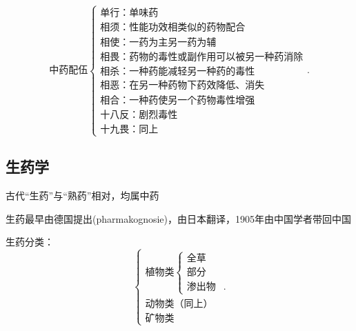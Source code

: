 \[
    \mbox{中药配伍}
    \begin{cases}
        \mbox{单行：单味药}\\ 
        \mbox{相须：性能功效相类似的药物配合}\\ 
        \mbox{相使：一药为主另一药为辅}\\
        \mbox{相畏：药物的毒性或副作用可以被另一种药消除}\\ 
        \mbox{相杀：一种药能减轻另一种药的毒性}\\ 
        \mbox{相恶：在另一种药物下药效降低、消失}\\ 
        \mbox{相合：一种药使另一个药物毒性增强}\\
        \mbox{十八反：剧烈毒性}\\ 
        \mbox{十九畏：同上}
    \end{cases}
.\] 
\subsection{生药学}%
\label{sub:生药学}
\begin{notation}
    古代“生药”与“熟药”相对，均属中药
\end{notation}
生药最早由德国提出(pharmakognosie)，由日本翻译，1905年由中国学者带回中国

生药分类：\[
    \begin{cases}
        \mbox{植物类}\begin{cases}
            \mbox{全草}\\ 
            \mbox{部分}\\ 
            \mbox{渗出物}
        \end{cases}\\ 
        \mbox{动物类（同上）}\\ 
        \mbox{矿物类}
    \end{cases}
.\] 

